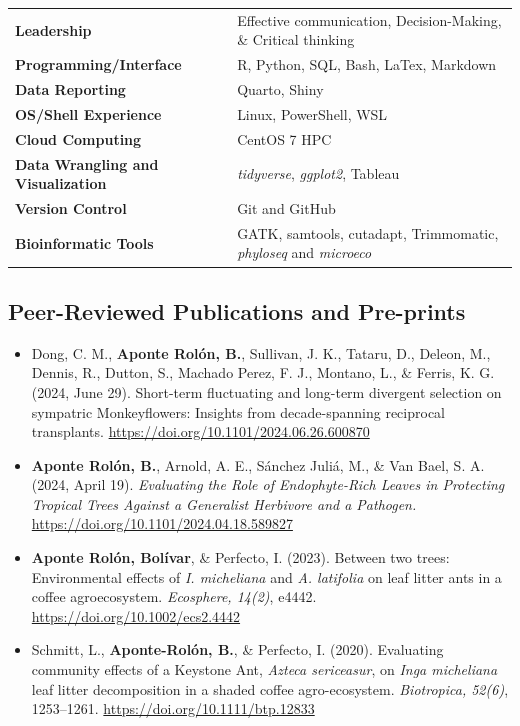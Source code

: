 \documentclass[
  letterpaper,
  DIV=11,
  numbers=noendperiod]{scrartcl}
\begin{document}
\begin{longtable}[]{@{}
  >{\raggedright\arraybackslash}p{}
  >{\raggedright\arraybackslash}p{}@{}}
\toprule\noalign{}
\endhead
\bottomrule\noalign{}
\endlastfoot
\textbf{Leadership} & Effective communication, Decision-Making, \&
Critical thinking \\
\textbf{Programming/Interface} & R, Python, SQL, Bash, LaTex,
Markdown \\
\textbf{Data Reporting} & Quarto, Shiny \\
\textbf{OS/Shell Experience} & Linux, PowerShell, WSL \\
\textbf{Cloud Computing} & CentOS 7 HPC \\
\textbf{Data Wrangling and Visualization} & \emph{tidyverse},
\emph{ggplot2}, Tableau \\
\textbf{Version Control} & Git and GitHub \\
\textbf{Bioinformatic Tools} & GATK, samtools, cutadapt, Trimmomatic,
\emph{phyloseq} and \emph{microeco} \\
\end{longtable}

\subsection{\texorpdfstring{ Peer-Reviewed Publications and
Pre-prints}{ Peer-Reviewed Publications and Pre-prints}}\label{peer-reviewed-publications-and-pre-prints}

\begin{itemize}
\item
  Dong, C. M., \textbf{Aponte Rolón, B.}, Sullivan, J. K., Tataru, D.,
  Deleon, M., Dennis, R., Dutton, S., Machado Perez, F. J., Montano, L.,
  \& Ferris, K. G. (2024, June 29). Short-term fluctuating and long-term
  divergent selection on sympatric Monkeyflowers: Insights from
  decade-spanning reciprocal transplants.
  \url{https://doi.org/10.1101/2024.06.26.600870}
\item
  \textbf{Aponte Rolón, B.}, Arnold, A. E., Sánchez Juliá, M., \& Van
  Bael, S. A. (2024, April 19). \emph{Evaluating the Role of
  Endophyte-Rich Leaves in Protecting Tropical Trees Against a
  Generalist Herbivore and a Pathogen.}
  \url{https://doi.org/10.1101/2024.04.18.589827}
\item
  \textbf{Aponte Rolón, Bolívar}, \& Perfecto, I. (2023). Between two
  trees: Environmental effects of \emph{I. micheliana} and \emph{A.
  latifolia} on leaf litter ants in a coffee agroecosystem.
  \emph{Ecosphere, 14(2)}, e4442.
  \url{https://doi.org/10.1002/ecs2.4442}
\item
  Schmitt, L., \textbf{Aponte-Rolón, B.}, \& Perfecto, I. (2020).
  Evaluating community effects of a Keystone Ant, \emph{Azteca
  sericeasur}, on \emph{Inga micheliana} leaf litter decomposition in a
  shaded coffee agro-ecosystem. \emph{Biotropica, 52(6)}, 1253--1261.
  \url{https://doi.org/10.1111/btp.12833}
\end{itemize}
\end{document}
